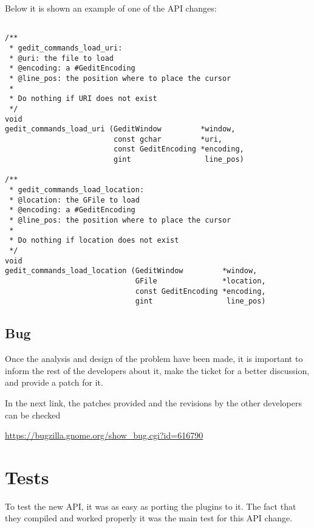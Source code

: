 Below it is shown an example of one of the API changes:

\begin{lstlisting}[style=GObject]

/**
 * gedit_commands_load_uri:
 * @uri: the file to load
 * @encoding: a #GeditEncoding
 * @line_pos: the position where to place the cursor
 *
 * Do nothing if URI does not exist
 */
void
gedit_commands_load_uri (GeditWindow         *window,
                         const gchar         *uri,
                         const GeditEncoding *encoding,
                         gint                 line_pos)

/**
 * gedit_commands_load_location:
 * @location: the GFile to load
 * @encoding: a #GeditEncoding
 * @line_pos: the position where to place the cursor
 *
 * Do nothing if location does not exist
 */
void
gedit_commands_load_location (GeditWindow         *window,
                              GFile               *location,
                              const GeditEncoding *encoding,
                              gint                 line_pos)

\end{lstlisting}

\newpage
\subsection{Bug}

Once the analysis and design of the problem have been made, it is important to inform the rest of the developers about it, make the ticket for a better discussion, and provide a patch for it.

In the next link, the patches provided and the revisions by the other developers can be checked 

\noindent\url{https://bugzilla.gnome.org/show_bug.cgi?id=616790}

\section{Tests}

To test the new API, it was as easy as porting the plugins to it. The fact that they compiled and worked properly it was the main test for this API change.
